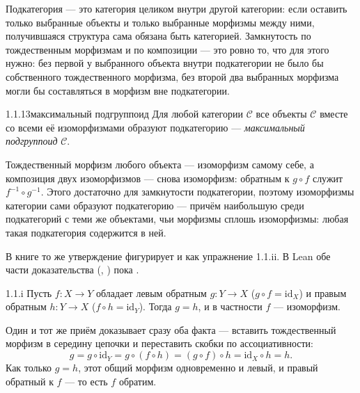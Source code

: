 \begin{intuition}
Подкатегория — это категория целиком внутри другой категории: если оставить только
выбранные объекты и только выбранные морфизмы между ними, получившаяся структура сама
обязана быть категорией. Замкнутость по тождественным морфизмам и по композиции — это
ровно то, что для этого нужно: без первой у выбранного объекта внутри подкатегории не
было бы собственного тождественного морфизма, без второй два выбранных морфизма могли
бы составляться в морфизм вне подкатегории.
\end{intuition}

\begin{lemma}{1.1.13}{максимальный подгруппоид}
Для любой категории $\mathcal{C}$ все объекты $\mathcal{C}$ вместе со всеми её
изоморфизмами образуют подкатегорию — \emph{максимальный подгруппоид} $\mathcal{C}$.
\end{lemma}

\begin{intuition}
Тождественный морфизм любого объекта — изоморфизм самому себе, а композиция двух
изоморфизмов — снова изоморфизм: обратным к $g \circ f$ служит $f^{-1} \circ g^{-1}$.
Этого достаточно для замкнутости подкатегории, поэтому изоморфизмы категории сами
образуют подкатегорию — причём наибольшую среди подкатегорий с теми же объектами, чьи
морфизмы сплошь изоморфизмы: любая такая подкатегория содержится в ней.
\end{intuition}

\begin{remark}
В книге то же утверждение фигурирует и как упражнение 1.1.ii. В Lean обе части
доказательства (, ) пока .
\end{remark}

\begin{exercise}{1.1.i}{}
Пусть $f \colon X \to Y$ обладает левым обратным $g \colon Y \to X$ ($g \circ f =
\mathrm{id}_X$) и правым обратным $h \colon Y \to X$ ($f \circ h = \mathrm{id}_Y$).
Тогда $g = h$, и в частности $f$ — изоморфизм.
\end{exercise}

\begin{intuition}
Один и тот же приём доказывает сразу оба факта — вставить тождественный морфизм в
середину цепочки и переставить скобки по ассоциативности:
\[
  g = g \circ \mathrm{id}_Y = g \circ (f \circ h) = (g \circ f) \circ h = \mathrm{id}_X
  \circ h = h.
\]
Как только $g=h$, этот общий морфизм одновременно и левый, и правый обратный к $f$ —
то есть $f$ обратим.
\end{intuition}

